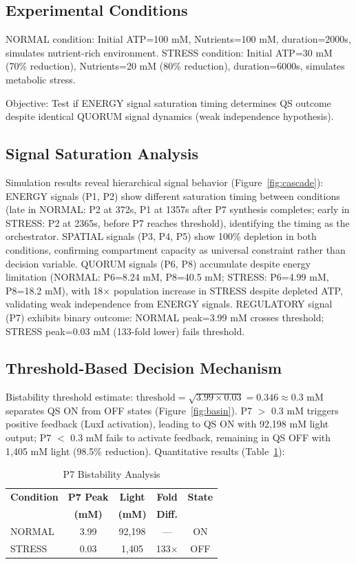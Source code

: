 \documentclass[twocolumn,11pt]{article}
\begin{document}
\subsection{Experimental Conditions}

NORMAL condition: Initial ATP=100 mM, Nutrients=100 mM, duration=2000s, simulates nutrient-rich environment. STRESS condition: Initial ATP=30 mM (70\% reduction), Nutrients=20 mM (80\% reduction), duration=6000s, simulates metabolic stress.

Objective: Test if ENERGY signal saturation timing determines QS outcome despite identical QUORUM signal dynamics (weak independence hypothesis).

\subsection{Signal Saturation Analysis}

Simulation results reveal hierarchical signal behavior (Figure~\ref{fig:cascade}): ENERGY signals (P1, P2) show different saturation timing between conditions (late in NORMAL: P2 at 372s, P1 at 1357s after P7 synthesis completes; early in STRESS: P2 at 2365s, before P7 reaches threshold), identifying the timing as the orchestrator. SPATIAL signals (P3, P4, P5) show 100\% depletion in both conditions, confirming compartment capacity as universal constraint rather than decision variable. QUORUM signals (P6, P8) accumulate despite energy limitation (NORMAL: P6=8.24 mM, P8=40.5 mM; STRESS: P6=4.99 mM, P8=18.2 mM), with 18× population increase in STRESS despite depleted ATP, validating weak independence from ENERGY signals. REGULATORY signal (P7) exhibits binary outcome: NORMAL peak=3.99 mM crosses threshold; STRESS peak=0.03 mM (133-fold lower) fails threshold.

\subsection{Threshold-Based Decision Mechanism}

Bistability threshold estimate: $\text{threshold} = \sqrt{3.99 \times 0.03} = 0.346 \approx 0.3$ mM separates QS ON from OFF states (Figure~\ref{fig:basin}). P7 $>$ 0.3 mM triggers positive feedback (LuxI activation), leading to QS ON with 92,198 mM light output; P7 $<$ 0.3 mM fails to activate feedback, remaining in QS OFF with 1,405 mM light (98.5\% reduction). Quantitative results (Table~\ref{tab:p7threshold}):
\begin{table}[H]
\centering
\caption{P7 Bistability Analysis}
\label{tab:p7threshold}
\small
\begin{tabular}{@{}lcccc@{}}
\toprule
\textbf{Condition} & \textbf{P7 Peak} & \textbf{Light} & \textbf{Fold} & \textbf{State} \\
 & \textbf{(mM)} & \textbf{(mM)} & \textbf{Diff.} & \\
\midrule
NORMAL & 3.99 & 92,198 & --- & ON \\
STRESS & 0.03 & 1,405 & 133$\times$ & OFF \\
\bottomrule
\end{tabular}
\end{table}
\end{document}
